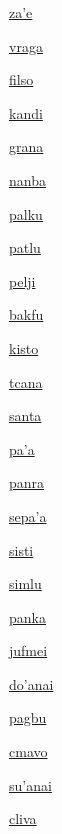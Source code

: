 {\hyperlink{val:zahe}{za'e}}{}{}{}

{\hyperlink{val:vraga}{vraga}}{}{}{}

{\hyperlink{val:filso}{filso}}{}{}{}

{\hyperlink{val:kandi}{kandi}}{}{}{}

{\hyperlink{val:grana}{grana}}{}{}{}

{\hyperlink{val:nanba}{nanba}}{}{}{}

{\hyperlink{val:palku}{palku}}{}{}{}

{\hyperlink{val:patlu}{patlu}}{}{}{}

{\hyperlink{val:pelji}{pelji}}{}{}{}

{\hyperlink{val:bakfu}{bakfu}}{}{}{}

{\hyperlink{val:kisto}{kisto}}{}{}{}

{\hyperlink{val:tcana}{tcana}}{}{}{}

{\hyperlink{val:santa}{santa}}{}{}{}

{\hyperlink{val:paha}{pa'a}}{}{}{}

{\hyperlink{val:panra}{panra}}{}{}{}

{\hyperlink{val:sepaha}{sepa'a}}{}{}{}

{\hyperlink{val:sisti}{sisti}}{}{}{}

{\hyperlink{val:simlu}{simlu}}{}{}{}

{\hyperlink{val:panka}{panka}}{}{}{}

{\hyperlink{val:jufmei}{jufmei}}{}{}{}

{\hyperlink{val:dohanai}{do'anai}}{}{}{}

{\hyperlink{val:pagbu}{pagbu}}{}{}{}

{\hyperlink{val:cmavo}{cmavo}}{}{}{}

{\hyperlink{val:suhanai}{su'anai}}{}{}{}

{\hyperlink{val:cliva}{cliva}}{}{}{}

